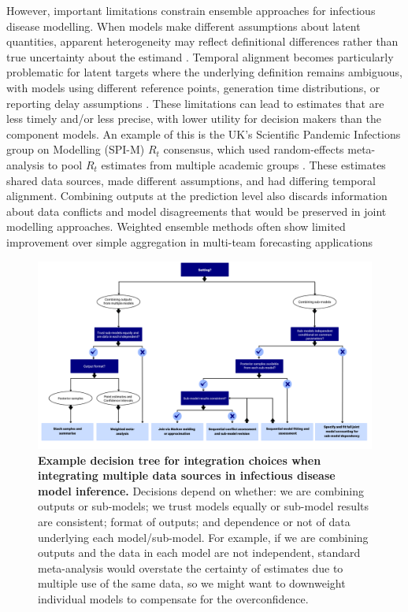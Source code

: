 \documentclass{article}
\begin{document}
However, important limitations constrain ensemble approaches for infectious disease modelling.
When models make different assumptions about latent quantities, apparent heterogeneity may reflect definitional differences rather than true uncertainty about the estimand \citep{brockhaus2023why}.
Temporal alignment becomes particularly problematic for latent targets where the underlying definition remains ambiguous, with models using different reference points, generation time distributions, or reporting delay assumptions \citep{brockhaus2023why}.
These limitations can lead to estimates that are less timely and/or less precise, with lower utility for decision makers than the component models.
An example of this is the UK's Scientific Pandemic Infections group on Modelling (SPI-M) $R_t$ consensus, which used random-effects meta-analysis to pool $R_t$ estimates from multiple academic groups \citep{manley2024combining}. These estimates shared data sources, made different assumptions, and had differing temporal alignment.
Combining outputs at the prediction level also discards information about data conflicts and model disagreements that would be preserved in joint modelling approaches.
Weighted ensemble methods often show limited improvement over simple aggregation in multi-team forecasting applications \citep{sherratt2021exploring}

\begin{figure}[htbp]
    \centering
    \includegraphics[width=\textwidth]{figures/Abbott et al figure 4.png}
    \caption{\textbf{Example decision tree for integration choices when integrating multiple data sources in infectious disease model inference.} Decisions depend on whether: we are combining outputs or sub-models; we trust models equally or sub-model results are consistent; format of outputs; and dependence or not of data underlying each model/sub-model. For example, if we are combining outputs and the data in each model are not independent, standard meta-analysis would overstate the certainty of estimates due to multiple use of the same data, so we might want to downweight individual models to compensate for the overconfidence.}
    \label{fig:integration}
\end{figure}
\end{document}
